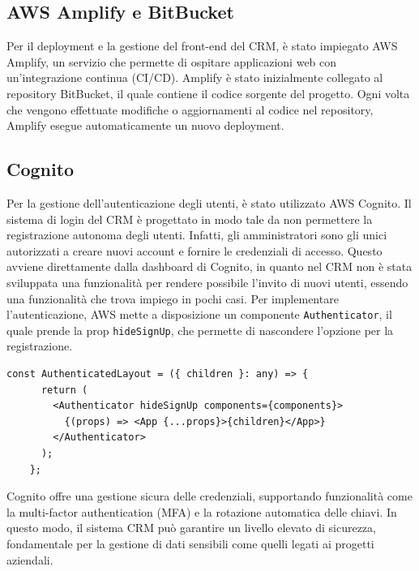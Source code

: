 \documentclass[target=bach,aauheader=,style=]{thud}
\begin{document}
\subsection{AWS Amplify e BitBucket}
Per il deployment e la gestione del front-end del CRM, è stato impiegato AWS Amplify, un servizio che permette di ospitare applicazioni web con un'integrazione continua (CI/CD). Amplify è stato inizialmente collegato al repository BitBucket, il quale contiene il codice sorgente del progetto. Ogni volta che vengono effettuate modifiche o aggiornamenti al codice nel repository, Amplify esegue automaticamente un nuovo deployment.

\subsection{Cognito}
Per la gestione dell'autenticazione degli utenti, è stato utilizzato AWS Cognito. Il sistema di login del CRM è progettato in modo tale da non permettere la registrazione autonoma degli utenti. Infatti, gli amministratori sono gli unici autorizzati a creare nuovi account e fornire le credenziali di accesso. Questo avviene direttamente dalla dashboard di Cognito, in quanto nel CRM non è stata sviluppata una funzionalità per rendere possibile l'invito di nuovi utenti, essendo una funzionalità che trova impiego in pochi casi. Per implementare l'autenticazione, AWS mette a disposizione un componente \texttt{Authenticator}, il quale prende la prop \texttt{hideSignUp}, che permette di nascondere l'opzione per la registrazione.


\begin{lstlisting}[caption=Parte del file \texttt{AuthenticatedLayout.tsx} del CRM]
    const AuthenticatedLayout = ({ children }: any) => {
      return (
        <Authenticator hideSignUp components={components}>
          {(props) => <App {...props}>{children}</App>}
        </Authenticator>
      );
    };
\end{lstlisting}

\noindent Cognito offre una gestione sicura delle credenziali, supportando funzionalità come la multi-factor authentication (MFA) e la rotazione automatica delle chiavi. In questo modo, il sistema CRM può garantire un livello elevato di sicurezza, fondamentale per la gestione di dati sensibili come quelli legati ai progetti aziendali.
\end{document}
